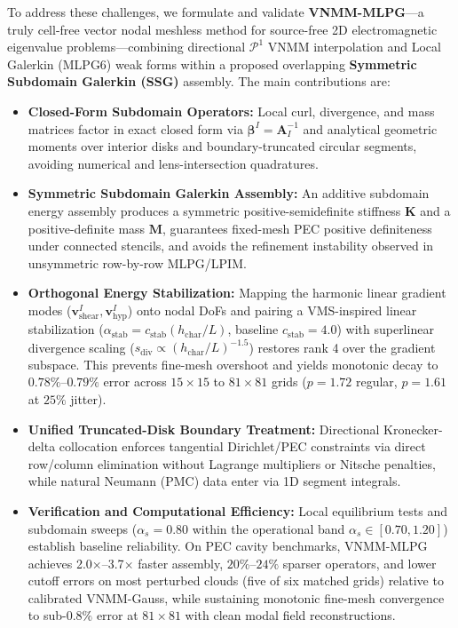 \documentclass[VANCOUVER]{USG}
\begin{document}
To address these challenges, we formulate and validate \textbf{VNMM-MLPG}---a truly cell-free vector nodal meshless method for source-free 2D electromagnetic eigenvalue problems---combining directional $\mathcal{P}^1$ VNMM interpolation \cite{ortiz2021nodal, stable_vnmm2d_2026} and Local Galerkin (MLPG6) weak forms \cite{atluri2002meshless} within a proposed overlapping \textbf{Symmetric Subdomain Galerkin (SSG)} assembly. The main contributions are:
\begin{itemize}
    \item \textbf{Closed-Form Subdomain Operators:} Local curl, divergence, and mass matrices factor in exact closed form via $\boldsymbol{\beta}^I = \mathbf{A}_I^{-1}$ and analytical geometric moments over interior disks and boundary-truncated circular segments, avoiding numerical and lens-intersection quadratures.
    \item \textbf{Symmetric Subdomain Galerkin Assembly:} An additive subdomain energy assembly produces a symmetric positive-semidefinite stiffness $\mathbf{K}$ and a positive-definite mass $\mathbf{M}$, guarantees fixed-mesh PEC positive definiteness under connected stencils, and avoids the refinement instability observed in unsymmetric row-by-row MLPG/LPIM.
    \item \textbf{Orthogonal Energy Stabilization:} Mapping the harmonic linear gradient modes ($\mathbf{v}_{\mathrm{shear}}^I, \mathbf{v}_{\mathrm{hyp}}^I$) onto nodal DoFs and pairing a VMS-inspired linear stabilization ($\alpha_{\mathrm{stab}} = c_{\mathrm{stab}}(h_{\mathrm{char}}/L)$, baseline $c_{\mathrm{stab}} = 4.0$) with superlinear divergence scaling ($s_{\mathrm{div}} \propto (h_{\mathrm{char}}/L)^{-1.5}$) restores rank 4 over the gradient subspace. This prevents fine-mesh overshoot and yields monotonic decay to $0.78\%\text{--}0.79\%$ error across $15\times 15$ to $81\times 81$ grids ($p = 1.72$ regular, $p = 1.61$ at $25\%$ jitter).
    \item \textbf{Unified Truncated-Disk Boundary Treatment:} Directional Kronecker-delta collocation enforces tangential Dirichlet/PEC constraints via direct row/column elimination without Lagrange multipliers or Nitsche penalties, while natural Neumann (PMC) data enter via 1D segment integrals.
    \item \textbf{Verification and Computational Efficiency:} Local equilibrium tests and subdomain sweeps ($\alpha_s = 0.80$ \cite{atluri2002meshless, liu2009mesh} within the operational band $\alpha_s \in [0.70, 1.20]$) establish baseline reliability. On PEC cavity benchmarks, VNMM-MLPG achieves 2.0$\times$--3.7$\times$ faster assembly, $20\%\text{--}24\%$ sparser operators, and lower cutoff errors on most perturbed clouds (five of six matched grids) relative to calibrated VNMM-Gauss, while sustaining monotonic fine-mesh convergence to sub-$0.8\%$ error at $81\times 81$ with clean modal field reconstructions.
\end{itemize}
\end{document}
